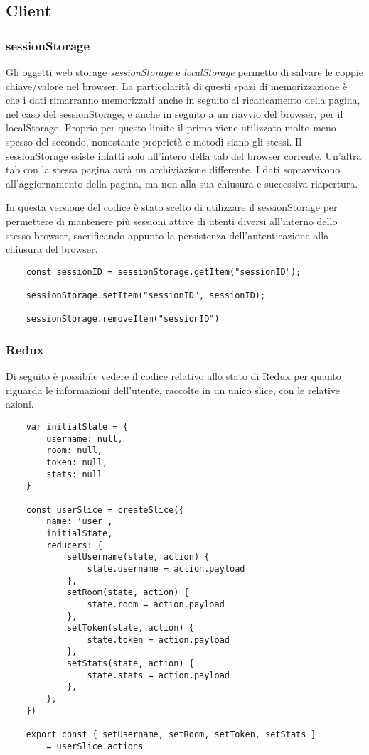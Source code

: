 \subsection{Client}

\subsubsection{sessionStorage}

Gli oggetti web storage \emph{sessionStorage} e \emph{localStorage} permetto di salvare le coppie chiave/valore nel browser. La particolarità di questi spazi di memorizzazione è che i dati rimarranno memorizzati anche in seguito al ricaricamento della pagina, nel caso del sessionStorage, e anche in seguito a un riavvio del browser, per il localStorage. Proprio per questo limite il primo viene utilizzato molto meno spesso del secondo, nonostante proprietà e metodi siano gli stessi. Il sessionStorage esiste infatti solo all'intero della tab del browser corrente. Un’altra tab con la stessa pagina avrà un archiviazione differente. I dati sopravvivono all'aggiornamento della pagina, ma non alla sua chiusura e successiva riapertura.

In questa versione del codice è stato scelto di utilizzare il sessionStorage per permettere di mantenere più sessioni attive di utenti diversi all'interno dello stesso browser, sacrificando appunto la persistenza dell'autenticazione alla chiusura del browser.

\begin{verbatim}
    const sessionID = sessionStorage.getItem("sessionID");
    
    sessionStorage.setItem("sessionID", sessionID);

    sessionStorage.removeItem("sessionID")
\end{verbatim}

\subsubsection{Redux}

Di seguito è possibile vedere il codice relativo allo stato di Redux per quanto riguarda le informazioni dell'utente, raccolte in un unico slice, con le relative azioni.

\begin{verbatim}
    var initialState = {
        username: null,
        room: null,
        token: null,
        stats: null
    }
    
    const userSlice = createSlice({
        name: 'user',
        initialState,
        reducers: {
            setUsername(state, action) {
                state.username = action.payload
            },
            setRoom(state, action) {
                state.room = action.payload
            },
            setToken(state, action) {
                state.token = action.payload
            },
            setStats(state, action) {
                state.stats = action.payload
            },
        },
    })
    
    export const { setUsername, setRoom, setToken, setStats } 
        = userSlice.actions
\end{verbatim}
